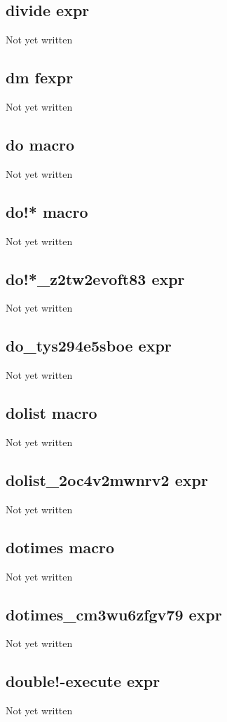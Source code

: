 \documentclass[a4paper,11pt]{article}
\begin{document}
\subsection{\ttfamily divide expr}
Not yet written

\subsection{\ttfamily dm fexpr}
Not yet written

\subsection{\ttfamily do macro}
Not yet written

\subsection{\ttfamily do!* macro}
Not yet written

\subsection{\ttfamily do!*\_z2tw2evoft83 expr}
Not yet written

\subsection{\ttfamily do\_tys294e5sboe expr}
Not yet written

\subsection{\ttfamily dolist macro}
Not yet written

\subsection{\ttfamily dolist\_2oc4v2mwnrv2 expr}
Not yet written

\subsection{\ttfamily dotimes macro}
Not yet written

\subsection{\ttfamily dotimes\_cm3wu6zfgv79 expr}
Not yet written

\subsection{\ttfamily double!-execute expr}
Not yet written
\end{document}
